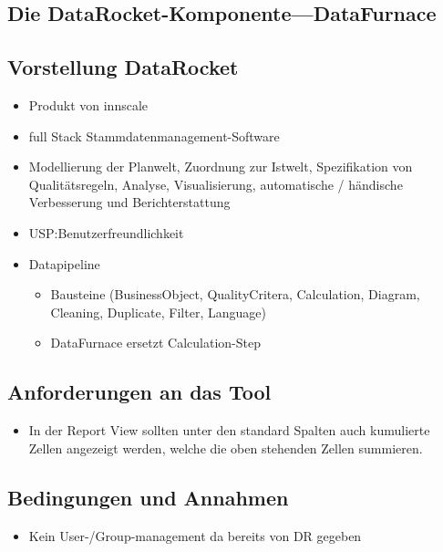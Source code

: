 \documentclass[
  language=german, %
  type=bachelor%
]{isthesis}
\begin{document}
\begin{content}
  \chapter{Die DataRocket-Komponente---DataFurnace}

  \section{Vorstellung DataRocket}
  \begin{itemize}
    \item Produkt von innscale
    \item full Stack Stammdatenmanagement-Software
    \item Modellierung der Planwelt, Zuordnung zur Istwelt, Spezifikation von
      Qualitätsregeln, Analyse, Visualisierung, automatische / händische
      Verbesserung und Berichterstattung
    \item USP:\@ Benutzerfreundlichkeit 
    \item Datapipeline
      \begin{itemize}
        \item Bausteine (BusinessObject, QualityCritera, Calculation, Diagram, Cleaning, Duplicate, Filter, Language)
        \item DataFurnace ersetzt Calculation-Step
      \end{itemize}
  \end{itemize}

  \section{Anforderungen an das Tool}
  \begin{itemize}
    \item In der Report View sollten unter den standard Spalten auch kumulierte
      Zellen angezeigt werden, welche die oben stehenden Zellen summieren.
  \end{itemize}

  \section{Bedingungen und Annahmen}
  \begin{itemize}
    \item Kein User-/Group-management da bereits von DR gegeben
  \end{itemize}


\end{content}
\end{document}
